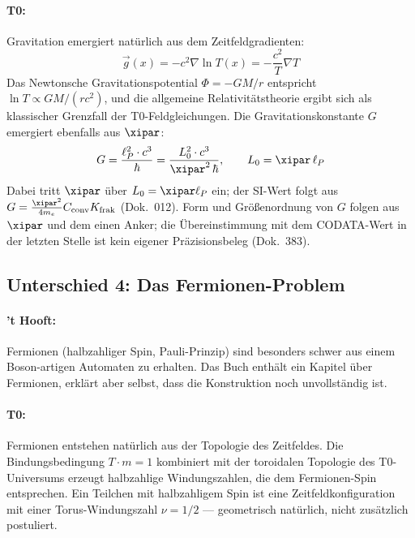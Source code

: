 \paragraph{T0:} Gravitation emergiert natürlich aus dem Zeitfeldgradienten:
\begin{equation}
    \vec{g}(x) = -c^2 \nabla \ln T(x) = -\frac{c^2}{T} \nabla T
    \label{eq:t0_gravity}
\end{equation}
Das Newtonsche Gravitationspotential $\Phi = -GM/r$ entspricht
$\ln T \propto GM/(rc^2)$, und die allgemeine Relativitätstheorie ergibt sich
als klassischer Grenzfall der T0-Feldgleichungen. Die Gravitationskonstante $G$
emergiert ebenfalls aus $\xipar$:
\begin{equation}
    G = \frac{\ell_P^2 \cdot c^3}{\hbar} = \frac{L_0^2 \cdot c^3}{\xipar^2\,\hbar}, \qquad L_0 = \xipar\,\ell_P
    \label{eq:G_from_xi}
\end{equation}
Dabei tritt $\xipar$ über $L_0 = \xipar\ell_P$ ein; der SI-Wert folgt aus
$G = \frac{\xipar^2}{4m_e}C_{\text{conv}}K_{\text{frak}}$ (Dok.~012). Form und
Größenordnung von $G$ folgen aus $\xipar$ und dem einen Anker; die Übereinstimmung
mit dem CODATA-Wert in der letzten Stelle ist kein eigener Präzisionsbeleg (Dok.~383).

\subsection{Unterschied 4: Das Fermionen-Problem}

\paragraph{'t Hooft:} Fermionen (halbzahliger Spin, Pauli-Prinzip) sind besonders
schwer aus einem Boson-artigen Automaten zu erhalten. Das Buch enthält ein Kapitel
über Fermionen, erklärt aber selbst, dass die Konstruktion noch unvollständig ist.

\paragraph{T0:} Fermionen entstehen natürlich aus der Topologie des Zeitfeldes.
Die Bindungsbedingung $T \cdot m = 1$ kombiniert mit der toroidalen Topologie
des T0-Universums erzeugt halbzahlige Windungszahlen, die dem Fermionen-Spin
entsprechen. Ein Teilchen mit halbzahligem Spin ist eine Zeitfeldkonfiguration
mit einer Torus-Windungszahl $\nu = 1/2$ — geometrisch natürlich, nicht
zusätzlich postuliert.

